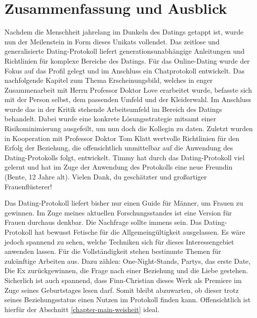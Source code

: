 \chapter{Zusammenfassung und Ausblick}
\label{summary}


Nachdem die Menschheit jahrelang im Dunkeln des Datings getappt ist, wurde nun der Meilenstein in Form dieses Unikats vollendet.
Das zeitlose und generalisierte Dating-Protokoll liefert generationsunabhängige Anleitungen und Richtlinien für komplexe Bereiche des Datings.
Für das Online-Dating wurde der Fokus auf das Profil gelegt und im Anschluss ein Chatprotokoll entwickelt.
Das nachfolgende Kapitel zum Thema Erscheinungsbild, welches in enger Zusammenarbeit mit Herrn Professor Doktor Love erarbeitet wurde, befasste sich mit der Person selbst, dem passenden Umfeld und der Kleiderwahl.
Im Anschluss wurde das in der Kritik stehende Arbeitsumfeld im Bereich des Datings behandelt.
Dabei wurde eine konkrete Lösungsstrategie mitsamt einer Risikominimierung ausgefeilt, um nun doch die Kollegin zu daten.
Zuletzt wurden in Kooperation mit Professor Doktor Tom Klatt wertvolle Richtlinien für den Erfolg der Beziehung, die offensichtlich unmittelbar auf die Anwendung des Dating-Protokolls folgt, entwickelt.
Timmy hat durch das Dating-Protokoll viel gelernt und hat im Zuge der Anwendung des Protokolls eine neue Freundin (Bente, 12 Jahre alt).
\glqq Vielen Dank, du geschätzter und großartiger Frauenflüsterer!\grqq
   
Das Dating-Protokoll liefert bisher nur einen Guide für Männer, um Frauen zu gewinnen.
Im Zuge meines aktuellen Forschungsstandes ist eine Version für Frauen durchaus denkbar.
Die Nachfrage sollte immens sein.
Das Dating-Protokoll hat bewusst Fetische für die Allgemeingültigkeit ausgelassen. 
Es wäre jedoch spannend zu sehen, welche Techniken sich für dieses Interessengebiet anwenden lassen.
Für die Vollständigkeit stehen bestimmte Themen für zukünftige Arbeiten aus.
Dazu zählen: One-Night-Stands, Partys, das erste Date, Die Ex zurückgewinnen, die Frage nach einer Beziehung und die Liebe gestehen.
Sicherlich ist auch spannend, dass Finn-Christian dieses Werk als Premiere im Zuge seines Geburtstages lesen darf.
Somit bleibt abzuwarten, ob dieser trotz seines Beziehungsstatus einen Nutzen im Protokoll finden kann.
Offensichtlich ist hierfür der Abschnitt \ref{chapter-main-weisheit} ideal.

